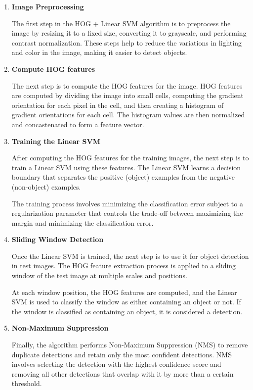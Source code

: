         \begin{enumerate}

            \item \textbf{Image Preprocessing}
        
            The first step in the HOG + Linear SVM algorithm is to preprocess the image by resizing it to a fixed size, converting it to grayscale, and performing contrast normalization. 
            These steps help to reduce the variations in lighting and color in the image, making it easier to detect objects.
            
            \item \textbf{Compute HOG features}
        
            The next step is to compute the HOG features for the image. 
            HOG features are computed by dividing the image into small cells, computing the gradient orientation for each pixel in the cell, and then creating a histogram of gradient orientations for each cell. 
            The histogram values are then normalized and concastenated to form a feature vector.

            \item \textbf{Training the Linear SVM}
        
            After computing the HOG features for the training images, the next step is to train a Linear SVM using these features. 
            The Linear SVM learns a decision boundary that separates the positive (object) examples from the negative (non-object) examples.
        
            The training process involves minimizing the classification error subject to a regularization parameter that controls the trade-off between maximizing the margin and minimizing the classification error.
        
            \item \textbf{Sliding Window Detection}
        
            Once the Linear SVM is trained, the next step is to use it for object detection in test images. 
            The HOG feature extraction process is applied to a sliding window of the test image at multiple scales and positions.
        
            At each window position, the HOG features are computed, and the Linear SVM is used to classify the window as either containing an object or not. 
            If the window is classified as containing an object, it is considered a detection.

            \item \textbf{Non-Maximum Suppression}
        
            Finally, the algorithm performs Non-Maximum Suppression (NMS) to remove duplicate detections and retain only the most confident detections. 
            NMS involves selecting the detection with the highest confidence score and removing all other detections that overlap with it by more than a certain threshold.

        \end{enumerate}

